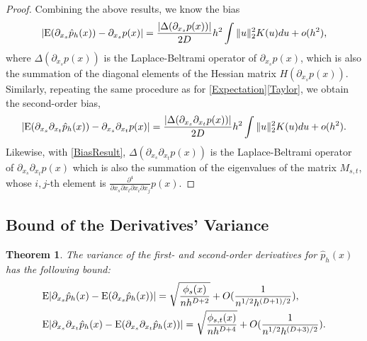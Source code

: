 \documentclass[aos,preprint]{imsart}
\newtheorem{theorem}{Theorem}[section]
\theoremstyle{remark}
\begin{document}
\begin{appendix}
\begin{proof}
Combining the above results, we know the bias
\begin{equation}\label{BiasResult}
|{\rm E}(\partial_{x_s} \hat{p}_h(x)) - \partial_{x_s}p(x)|  = \frac{|\Delta(\partial_{x_s} p(x))|}{2D} h^2 \int \|u\|_2^2 K(u) du+o(h^2),
\end{equation}
where $\Delta(\partial_{x_s} p(x))$ is the Laplace-Beltrami operator of $\partial_{x_s} p(x)$, which is also the summation of the diagonal elements of the Hessian matrix $H(\partial_{x_s}p(x))$. Similarly, repeating the same procedure as for \eqref{Expectation}\eqref{Taylor}, we obtain the second-order bias,
\begin{equation}\label{order2}
|{\rm E}( \partial_{x_s} \partial_{x_t}   \hat{p}_h(x)) -  \partial_{x_s} \partial_{x_t} p(x)| = \frac{|\Delta(\partial_{x_s}\partial_{x_t} p(x))|}{2D} h^2 \int \|u\|_2^2 K(u) du+o(h^2).
\end{equation}
Likewise, with \eqref{BiasResult}, $\Delta(\partial_{x_s}\partial_{x_t} p(x))$ is the Laplace-Beltrami operator of $\partial_{x_s}\partial_{x_t} p(x)$ which is also the summation of the eigenvalues of the matrix $M_{s,t}$, whose $i,j$-th element is $\frac{\partial^4}{\partial x_s\partial x_t \partial x_i \partial x_j} p(x)$.%
\end{proof}
\subsection{Bound of the Derivatives' Variance}\label{variance_proof}
\begin{theorem}
The variance of the first- and second-order derivatives for $\hat{p}_h(x)$ has the following bound: 
\begin{equation*}\label{VarResult}
\begin{aligned}
&{\rm E} |\partial_{x_s} \hat{p}_h(x)-{\rm E}(\partial_{x_s} \hat{p}_h(x))| = \sqrt{\frac{\phi_s(x)}{n h^{D+2}}}+O(\frac{1}{n^{1/2}h^{(D+1)/2}}),\\
&{\rm E} | \partial_{x_s}\partial_{x_t} \hat{p}_h(x) -{\rm E}(\partial_{x_s}\partial_{x_t} \hat{p}_h(x))| = \sqrt{\frac{\phi_{s,t}(x)}{nh^{D+4}}}+O(\frac{1}{n^{1/2}h^{(D+3)/2}}).
\end{aligned}
\end{equation*}
\end{theorem}


\end{appendix}
\end{document}
